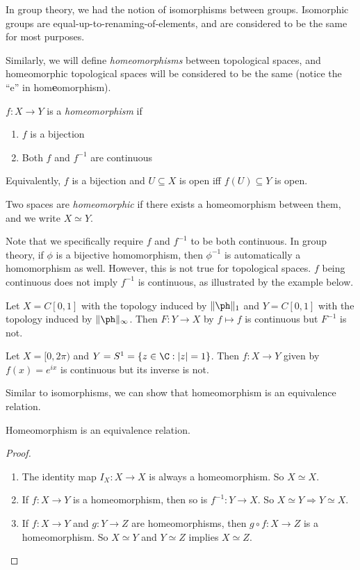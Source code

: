 \documentclass[a4paper]{article}
\begin{document}
In group theory, we had the notion of isomorphisms between groups. Isomorphic groups are equal-up-to-renaming-of-elements, and are considered to be the same for most purposes.

Similarly, we will define \emph{homeomorphisms} between topological spaces, and homeomorphic topological spaces will be considered to be the same (notice the ``e'' in hom\textbf{e}omorphism).
\begin{defi}[Homeomorphism]
  $f: X\to Y$ is a \emph{homeomorphism} if
  \begin{enumerate}
    \item $f$ is a bijection
    \item Both $f$ and $f^{-1}$ are continuous
  \end{enumerate}
  Equivalently, $f$ is a bijection and $U\subseteq X$ is open iff $f(U)\subseteq Y$ is open.

  Two spaces are \emph{homeomorphic} if there exists a homeomorphism between them, and we write $X\simeq Y$.
\end{defi}
Note that we specifically require $f$ and $f^{-1}$ to be both continuous. In group theory, if $\phi$ is a bijective homomorphism, then $\phi^{-1}$ is automatically a homomorphism as well. However, this is not true for topological spaces. $f$ being continuous does not imply $f^{-1}$ is continuous, as illustrated by the example below.

\begin{eg}
  Let $X = C[0, 1]$ with the topology induced by $\|\ph \|_1$ and $Y = C[0, 1]$ with the topology induced by $\|\ph\|_\infty$. Then $F: Y\to X$ by $f\mapsto f$ is continuous but $F^{-1}$ is not.
\end{eg}

\begin{eg}
  Let $X = [0, 2\pi)$ and $Y = S^1 = \{z \in \C: |z| = 1\}$. Then $f: X \to Y$ given by $f(x) = e^{ix}$ is continuous but its inverse is not.
\end{eg}

Similar to isomorphisms, we can show that homeomorphism is an equivalence relation.
\begin{lemma}
  Homeomorphism is an equivalence relation.
\end{lemma}

\begin{proof}\leavevmode
  \begin{enumerate}
    \item The identity map $I_X: X\to X$ is always a homeomorphism. So $X\simeq X$.
    \item If $f: X\to Y$ is a homeomorphism, then so is $f^{-1}:Y\to X$. So $X\simeq Y \Rightarrow Y\simeq X$.
    \item If $f: X\to Y$ and $g: Y\to Z$ are homeomorphisms, then $g\circ f: X\to Z$ is a homeomorphism. So $X\simeq Y$ and $Y\simeq Z$ implies $X\simeq Z$.\qedhere
  \end{enumerate}
\end{proof}
\end{document}
